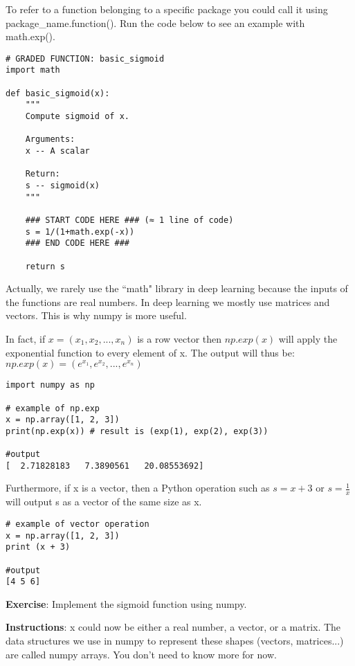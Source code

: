 To refer to a function belonging to a specific package you could call it using package\_name.function(). Run the code below to see an example with math.exp().

\begin{verbatim}
# GRADED FUNCTION: basic_sigmoid
import math

def basic_sigmoid(x):
    """
    Compute sigmoid of x.

    Arguments:
    x -- A scalar

    Return:
    s -- sigmoid(x)
    """
    
    ### START CODE HERE ### (≈ 1 line of code)
    s = 1/(1+math.exp(-x))
    ### END CODE HERE ###
    
    return s
\end{verbatim}

Actually, we rarely use the ``math" library in deep learning because the inputs of the functions are real numbers. In deep learning we mostly use matrices and vectors. This is why numpy is more useful.

In fact, if $ x = (x_1, x_2, ..., x_n)$ is a row vector then $np.exp(x)$ will apply the exponential function to every element of x. The output will thus be: $np.exp(x) = (e^{x_1}, e^{x_2}, ..., e^{x_n})$
\begin{verbatim}
import numpy as np

# example of np.exp
x = np.array([1, 2, 3])
print(np.exp(x)) # result is (exp(1), exp(2), exp(3))

#output
[  2.71828183   7.3890561   20.08553692]
\end{verbatim}

Furthermore, if x is a vector, then a Python operation such as $s = x + 3$ or $s = \frac{1}{x}$ will output s as a vector of the same size as x.
\begin{verbatim}
# example of vector operation
x = np.array([1, 2, 3])
print (x + 3)

#output
[4 5 6]
\end{verbatim}

{\textbf {Exercise}}: Implement the sigmoid function using numpy. 

{\textbf {Instructions}}: x could now be either a real number, a vector, or a matrix. The data structures we use in numpy to represent these shapes (vectors, matrices...) are called numpy arrays. You don't need to know more for now.

